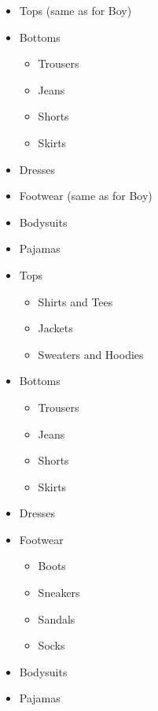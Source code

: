 \begin{itemize}
\setlength{\itemsep}{-3pt}
\setlength{\parskip}{0pt}
\setlength{\parsep}{0pt}

	 \item Tops (same as for Boy)
     \item Bottoms
	 	\begin{itemize}
\setlength{\itemsep}{-3pt}
\setlength{\parskip}{0pt}
\setlength{\parsep}{0pt}
		 \item Trousers
		 \item Jeans
		 \item Shorts
		 \item Skirts
		\end{itemize}
	 \item Dresses 
	 \item Footwear (same as for Boy)
	 \item Bodysuits	
     \item Pajamas
	\end{itemize}
\begin{itemize}
\setlength{\itemsep}{-3pt}
\setlength{\parskip}{0pt}
\setlength{\parsep}{0pt}

	 \item Tops
	 	\begin{itemize}
\setlength{\itemsep}{-3pt}
\setlength{\parskip}{0pt}
\setlength{\parsep}{0pt}
		 \item Shirts and Tees
      	 \item Jackets
      	 \item Sweaters and Hoodies
		\end{itemize}
     \item Bottoms
	 	\begin{itemize}
\setlength{\itemsep}{-3pt}
\setlength{\parskip}{0pt}
\setlength{\parsep}{0pt}
		 \item Trousers
		 \item Jeans
		 \item Shorts
		 \item Skirts
		\end{itemize}
	 \item Dresses
	 \item Footwear
	 	\begin{itemize}
\setlength{\itemsep}{-3pt}
\setlength{\parskip}{0pt}
\setlength{\parsep}{0pt}
		 \item Boots
		 \item Sneakers
		 \item Sandals
		 \item Socks
		\end{itemize}
	 \item Bodysuits	
     \item Pajamas
	\end{itemize}


